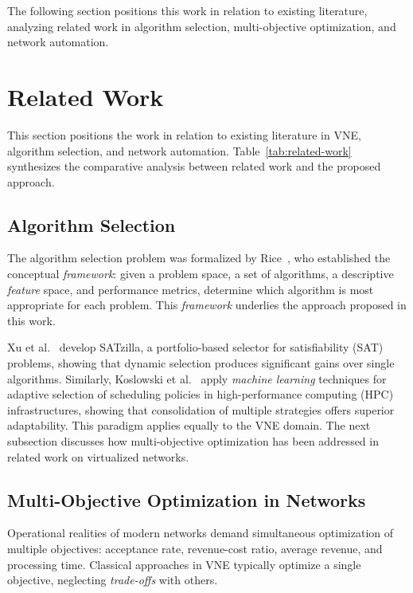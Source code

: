 \documentclass[conference]{IEEEtran}
\begin{document}
The following section positions this work in relation to existing literature, analyzing related work in algorithm selection, multi-objective optimization, and network automation.

\section{Related Work}
\label{sec:RelatedWork}

This section positions the work in relation to existing literature in VNE, algorithm selection, and network automation.
Table~\ref{tab:related-work} synthesizes the comparative analysis between related work and the proposed approach.

\subsection{Algorithm Selection}
\label{subsec:alg-selection}

The algorithm selection problem was formalized by Rice~\cite{rice1976algorithm}, who established the conceptual \textit{framework}: given a problem space, a set of algorithms, a descriptive \textit{feature} space, and performance metrics, determine which algorithm is most appropriate for each problem. This \textit{framework} underlies the approach proposed in this work.

Xu et al.~\cite{xu2012satzilla} develop SATzilla, a portfolio-based selector for satisfiability (SAT) problems, showing that dynamic selection produces significant gains over single algorithms. Similarly, Koslowski et al.~\cite{koslowski2025knowledge-based} apply \textit{machine learning} techniques for adaptive selection of scheduling policies in high-performance computing (HPC) infrastructures, showing that consolidation of multiple strategies offers superior adaptability. This paradigm applies equally to the VNE domain. The next subsection discusses how multi-objective optimization has been addressed in related work on virtualized networks.

\subsection{Multi-Objective Optimization in Networks}
\label{subsec:multiobj-networks}

Operational realities of modern networks demand simultaneous optimization of multiple objectives: acceptance rate, revenue-cost ratio, average revenue, and processing time. Classical approaches in VNE typically optimize a single objective, neglecting \textit{trade-offs} with others.
\end{document}
